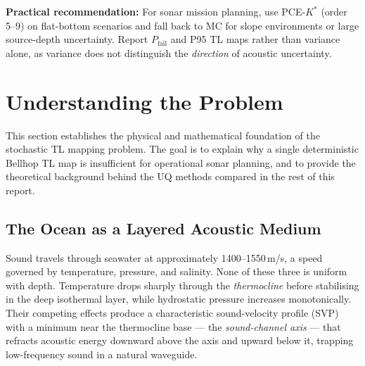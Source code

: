 \documentclass[11pt,a4paper]{article}
\begin{document}
\textbf{Practical recommendation:} For sonar mission planning, use
PCE-$K^*$ (order 5--9) on flat-bottom scenarios and fall back to MC for slope
environments or large source-depth uncertainty.  Report $P_\mathrm{fail}$ and
P95 TL maps rather than variance alone, as variance does not distinguish the
\emph{direction} of acoustic uncertainty.

\section{Understanding the Problem}
\label{sec:understanding}

This section establishes the physical and mathematical foundation of the
stochastic TL mapping problem.
The goal is to explain why a single deterministic Bellhop TL map is
insufficient for operational sonar planning, and to provide the theoretical
background behind the UQ methods compared in the rest of this report.

\subsection{The Ocean as a Layered Acoustic Medium}
\label{sec:ocean_layers}

Sound travels through seawater at approximately 1400--1550\,m/s, a speed
governed by temperature, pressure, and salinity.
None of these three is uniform with depth.
Temperature drops sharply through the \emph{thermocline} before stabilising in
the deep isothermal layer, while hydrostatic pressure increases monotonically.
Their competing effects produce a characteristic sound-velocity profile (SVP)
with a minimum near the thermocline base --- the \emph{sound-channel axis} ---
that refracts acoustic energy downward above the axis and upward below it,
trapping low-frequency sound in a natural waveguide.
\end{document}
